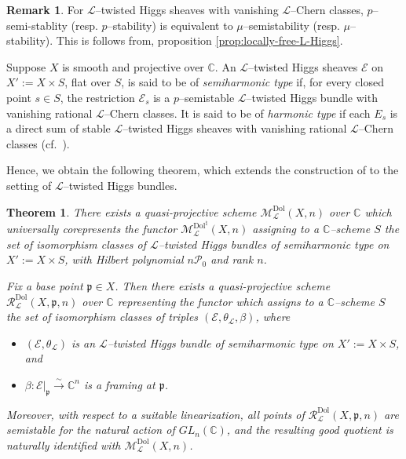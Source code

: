 \documentclass[12pt,reqno]{amsart}
\numberwithin{equation}{subsection}
\newtheorem{thm}[equation]{Theorem}
\theoremstyle{definition}
\newtheorem{rem}[equation]{Remark}
\theoremstyle{theorem}
\begin{document}
\begin{rem}
For $\mathcal{L}$--twisted Higgs sheaves with vanishing $\mathcal{L}$--Chern classes, $p$--semi-stablity (resp. $p$--stability) is equivalent to $\mu$--semistability (resp. $\mu$--stability). This is follows from, proposition \eqref{prop:locally-free-L-Higgs}.
\end{rem}

Suppose $X$ is smooth and projective over $\mathbb{C}$. 
An $\mathcal{L}$--twisted Higgs sheaves $\mathcal{E}$ on $X' := X \times S$, flat over $S$, is said to be of \emph{semiharmonic type} if, for every closed point $s \in S$, the restriction $\mathcal{E}_{s}$ is a $p$--semistable
$\mathcal{L}$--twisted Higgs bundle with vanishing rational
$\mathcal{L}$--Chern classes. It is said to be of \emph{harmonic type} if each $E_{s}$ is a direct sum of
stable $\mathcal{L}$--twisted Higgs sheaves with vanishing rational
$\mathcal{L}$--Chern classes (cf.~\cite[\S\,6, p.~17]{CT.Simpson-1995}).


Hence, we obtain the following theorem, which extends the construction of
\cite[\S\,6, p.~17]{CT.Simpson-1995} to the setting of
$\mathcal{L}$--twisted Higgs bundles.


\begin{thm}\label{eqn: moduli-of-L- twisted Higgs bundles}
	There exists a quasi-projective scheme $\mathcal{M}^{\mathrm{Dol}}_{\mathcal{L}}(X,n)$ over $\mathbb{C}$ which universally corepresents the functor
	$\mathcal{M}^{\mathrm{Dol}^{\natural}}_{\mathcal{L}}(X,n)$ assigning to a $\mathbb{C}$--scheme $S$ the set of isomorphism classes of $\mathcal{L}$--twisted Higgs bundles of semiharmonic type on $X' := X \times S$, with Hilbert polynomial $n\mathcal{P}_{0}$ and rank $n$.
	
	Fix a base point $\mathfrak{p} \in X$. 
	Then there exists a quasi-projective scheme
	$\mathcal{R}^{\mathrm{Dol}}_{\mathcal{L}}(X,\mathfrak{p},n)$ over $\mathbb{C}$ representing the functor which assigns to a $\mathbb{C}$--scheme $S$ the set of isomorphism classes of triples $(\mathcal{E},\theta_{\mathcal{L}},\beta)$, where
	\begin{itemize}
		\item $(\mathcal{E},\theta_{\mathcal{L}})$ is an $\mathcal{L}$--twisted Higgs bundle of semiharmonic type on $X' := X \times S$, and
		\item $\beta : \mathcal{E}|_{\mathfrak{p}} \xrightarrow{\sim} \mathbb{C}^{n}$ is a framing at $\mathfrak{p}$.
	\end{itemize}
	Moreover, with respect to a suitable linearization, all points of
	$\mathcal{R}^{\mathrm{Dol}}_{\mathcal{L}}(X,\mathfrak{p},n)$ are semistable for the natural action of $GL_{n}(\mathbb{C})$, and the resulting good quotient is naturally identified with
	$\mathcal{M}^{\mathrm{Dol}}_{\mathcal{L}}(X,n)$.
\end{thm}
\end{document}
